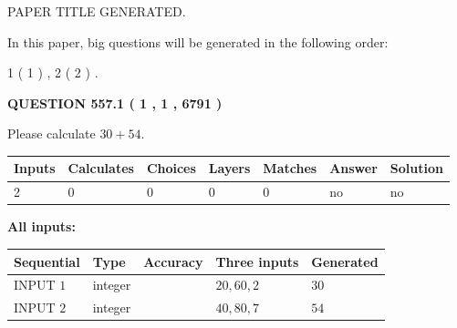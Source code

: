 \documentclass[12pt]{article}
\begin{document}
   
\vspace{0.2in}
   
   
   
   
   
   
   
   
 \vspace{0.2in}
 
 
 
 
   
   
 PAPER TITLE GENERATED.
   
   
   
\vspace{0.2in}
   
In this paper, big questions will be generated in the following order: 
   
   
   1 ( 1 )
 ,
   2 ( 2 )
 .
  
\vspace{0.2in}
  
{\textbf{\Large{QUESTION
557.1 
 ( 1 , 1 , 6791 )
}}}
  
  
 
Please calculate $ %
30 +  %
54 $.
 
 
   
   
   
   
\noindent\begin{tabular}{|l|l|l|l|l|l|l|}
 \hline
Inputs & Calculates & Choices & Layers & Matches & Answer & Solution \\ \hline
 2  & 
 0  & 
 0
  & 
 0  & 
 0  & 
  no & 
  no 
  \\ \hline
 \end{tabular}
   
   
   
   
\noindent{}
   
   
   
   
\noindent\vspace{0.1in}\hspace{-0.08in} {\textbf{\Large{All inputs: }}}
   
   
  
  
\noindent\begin{tabular}{|l|l|l|l|l|}
\hline
 Sequential & Type & Accuracy & Three inputs & Generated \\ 
\hline
 
 
  INPUT $  1 $ & integer &  & $
 20
 , 
 60
 , 
 2
 $ & $ 30 $ 
 \\  \hline  
 
 
  INPUT $  2 $ & integer &  & $
 40
 , 
 80
 , 
 7
 $ & $ 54 $ 
 \\  \hline  
 \end{tabular}
   
\end{document}

